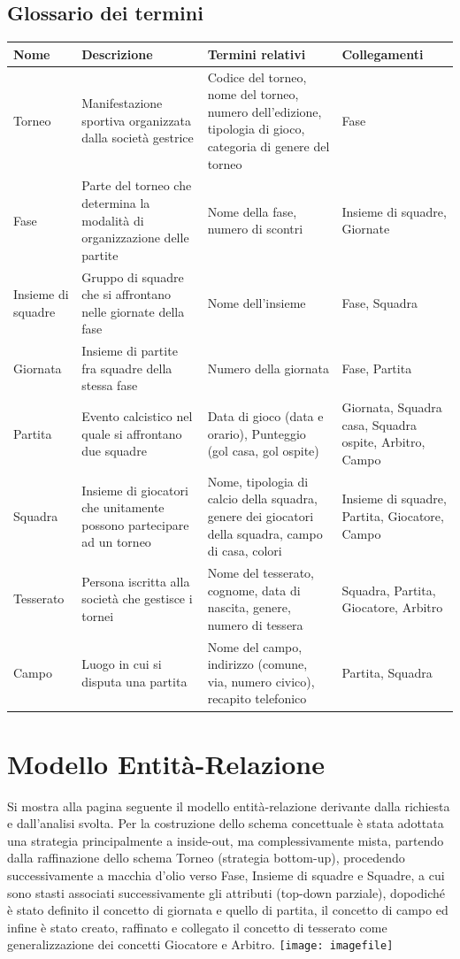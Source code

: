 \documentclass[11pt, openany]{article}
\theoremstyle{definition}
\theoremstyle{plain}
\theoremstyle{remark}
\begin{document}
			\newpage\subsection{Glossario dei termini}
				\begin{tabularx}{\textwidth}{p{1.8cm}p{6cm}Xp{3.5cm}}
					\textbf{Nome} & \textbf{Descrizione} & \textbf{Termini relativi} & \textbf{Collegamenti}\\\toprule[1.2pt]
					Torneo & Manifestazione sportiva organizzata dalla società gestrice & Codice del torneo, nome del torneo, numero dell’edizione, tipologia di gioco, categoria di genere del torneo & Fase\\\midrule
					Fase & Parte del torneo che determina la modalità di organizzazione delle partite & Nome della fase, numero di scontri & Insieme di squadre, Giornate\\\midrule
					Insieme di squadre & Gruppo di squadre che si affrontano nelle giornate della fase & Nome dell'insieme & Fase, Squadra\\\midrule
					Giornata & Insieme di partite fra squadre della stessa fase & Numero della giornata & Fase, Partita\\\midrule
					Partita & Evento calcistico nel quale si affrontano due squadre & Data di gioco (data e	orario), Punteggio (gol casa, gol ospite) & Giornata, Squadra casa, Squadra ospite, Arbitro, Campo\\\midrule
					Squadra & Insieme di giocatori che unitamente possono partecipare ad un torneo & Nome, tipologia di calcio della squadra, genere dei giocatori della squadra, campo di	casa, colori & Insieme di squadre, Partita, Giocatore, Campo\\\midrule
					Tesserato & Persona iscritta alla società che gestisce i tornei & Nome del tesserato, cognome, data di nascita, genere, numero di tessera & Squadra, Partita, Giocatore, Arbitro\\\midrule
					Campo & Luogo in cui si disputa una partita & Nome del campo, indirizzo (comune, via, numero civico), recapito telefonico & Partita, Squadra
				\end{tabularx}
				
		\section{Modello Entità-Relazione}
			Si mostra alla pagina seguente il modello entità-relazione derivante dalla richiesta e dall’analisi svolta.	Per la costruzione dello schema concettuale è stata adottata una strategia principalmente a inside-out,	ma complessivamente mista, partendo dalla raffinazione dello schema Torneo (strategia bottom-up), procedendo successivamente a macchia d’olio verso Fase, Insieme di squadre e Squadre, a cui sono stasti associati successivamente gli attributi (top-down parziale), dopodiché è stato definito il concetto di giornata e quello di partita, il concetto di campo ed infine è stato creato, raffinato e collegato il concetto di tesserato come generalizzazione dei concetti Giocatore e Arbitro.
			\texttt{[image: imagefile]}
				
\end{document}

